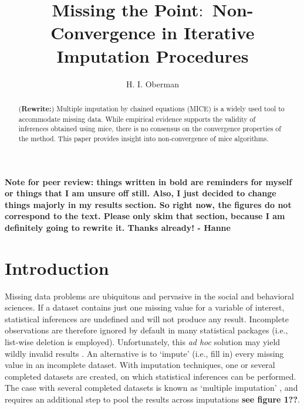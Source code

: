 \documentclass[Royal,times,sageh]{sagej}
\begin{document}
\title{Missing the Point\(\colon\) Non-Convergence in Iterative Imputation
Procedures}


\author{H. I. Oberman}




\begin{abstract}
(\textbf{Rewrite:}) Multiple imputation by chained equations (MICE) is a
widely used tool to accommodate missing data. While empirical evidence
supports the validity of inferences obtained using mice, there is no
consensus on the convergence properties of the method. This paper
provides insight into non-convergence of mice algorithms.
\end{abstract}


\maketitle

\textbf{Note for peer review: things written in bold are reminders for
myself or things that I am unsure off still. Also, I just decided to
change things majorly in my results section. So right now, the figures
do not correspond to the text. Please only skim that section, because I
am definitely going to rewrite it. Thanks already! - Hanne}

\hypertarget{introduction}{%
\section{Introduction}\label{introduction}}

Missing data problems are ubiquitous and pervasive in the social and
behavioral sciences. If a dataset contains just one missing value for a
variable of interest, statistical inferences are undefined and will not
produce any result. Incomplete observations are therefore ignored by
default in many statistical packages (i.e., list-wise deletion is
employed). Unfortunately, this \emph{ad hoc} solution may yield wildly
invalid results \citep{buur18}. An alternative is to `impute' (i.e.,
fill in) every missing value in an incomplete dataset. With imputation
techniques, one or several completed datasets are created, on which
statistical inferences can be performed. The case with several completed
datasets is known as `multiple imputation' \citep[MI;][]{rubin76}, and
requires an additional step to pool the results across imputations
\textbf{see figure 1??}.
\end{document}
